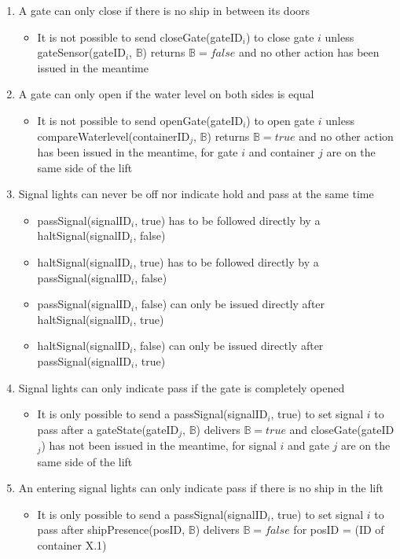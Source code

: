 \begin{enumerate}
	\item A gate can only close if there is no ship in between its doors
	\begin{itemize}
		\item It is not possible to send closeGate(gateID$_i$) to close gate $i$ unless gateSensor(gateID$_i$, $\mathbb{B}$) returns $\mathbb{B} = false$ and no other action has been issued in the meantime
	\end{itemize}
	
	\item A gate can only open if the water level on both sides is equal
	\begin{itemize}
		\item It is not possible to send openGate(gateID$_i$) to open gate $i$ unless compareWaterlevel(containerID$_j$, $\mathbb{B}$) returns $\mathbb{B} = true$ and no other action has been issued in the meantime, for gate $i$ and container $j$ are on the same side of the lift
	\end{itemize}
	
	\item Signal lights can never be off nor indicate hold and pass at the same time
		\begin{itemize}
			\item passSignal(signalID$_i$, true) has to be followed directly by a haltSignal(signalID$_i$, false)
			\item haltSignal(signalID$_i$, true) has to be followed directly by a passSignal(signalID$_i$, false)
			\item passSignal(signalID$_i$, false) can only be issued directly after haltSignal(signalID$_i$, true)
			\item haltSignal(signalID$_i$, false) can only be issued directly after passSignal(signalID$_i$, true)
		\end{itemize}
	\item Signal lights can only indicate pass if the gate is completely opened
		\begin{itemize}
			\item It is only possible to send a passSignal(signalID$_i$, true) to set signal $i$ to pass after a gateState(gateID$_j$, $ \mathbb{B} $) delivers $\mathbb{B} = true$ and closeGate(gateID$_j$) has not been issued in the meantime, for signal $i$ and gate $j$ are on the same side of the lift
		\end{itemize}
	\item An entering signal lights can only indicate pass if there is no ship in the lift
		\begin{itemize}
			\item It is only possible to send a passSignal(signalID$_i$, true) to set signal $i$ to pass after shipPresence(posID, $\mathbb{B}$) delivers $\mathbb{B} = false$ for posID = (ID of container X.1)
		\end{itemize}
\end{enumerate}

